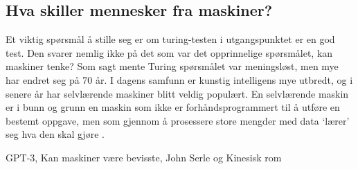 
\subsection{Hva skiller mennesker fra maskiner?}

Et viktig spørsmål å stille seg er om turing-testen i utgangspunktet er en god test. 
Den svarer nemlig ikke på det som var det opprinnelige spørsmålet, kan maskiner tenke? 
Som sagt mente Turing spørsmålet var meningsløst, men mye har endret seg på 70 år. 
I dagens samfunn er kunstig intelligens mye utbredt, og i senere år har selvlærende maskiner blitt veldig populært.
En selvlærende maskin er i bunn og grunn en maskin som ikke er forhåndsprogrammert til å utføre en bestemt oppgave, 
men som gjennom å prosessere store mengder med data `lærer' seg hva den skal gjøre \autocite[3]{Kiran2013}. 

GPT-3, Kan maskiner være bevisste,
John Serle og Kinesisk rom